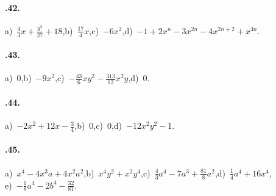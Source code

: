 \paragraph{\thechapter.42.} a)~$\frac{4}{3}x+\frac{y^{3}}{27}+18$,\quad b)~$\frac{17}{4}x$,\quad c)~$-6x^2$,\quad d)~$-1+2x^{n}-3x^{2n}-4x^{2n+2}+x^{4n}$.
\paragraph{\thechapter.43.} a)~$0$,\quad b)~$-9x^2$,\quad c)~$-\frac{43}{6}xy^{2}-\frac{313}{12}x^{2}y$,\quad d)~$0$.
\paragraph{\thechapter.44.} a)~$-2x^{2}+12x-\frac{3}{4}$,\quad b)~$0$,\quad c)~$0$,\quad d)~$-12x^{2}y^{2}-1$.
\paragraph{\thechapter.45.} a)~$x^{4}-4x^{3}a+4x^{2}a^{2}$,\quad b)~$x^{4}y^{2}+x^{2}y^{4}$,\quad c)~$\frac{4}{3}a^{4}-7a^{3}+\frac{81}{8}a^{2}$,\quad d)~$\frac{1}{4}a^{4}+16x^{4}$,\protect\\ e)~$-\frac{1}{8}a^{4}-2b^{4}-\frac{32}{81}$.
